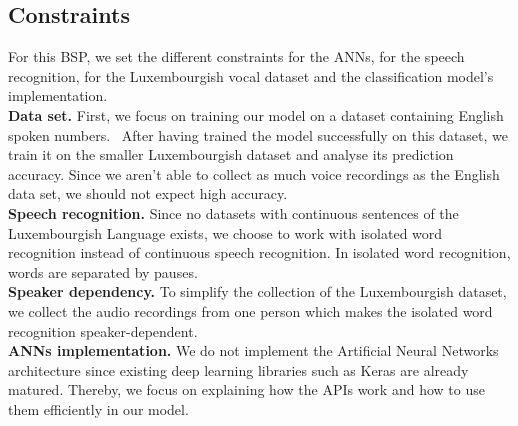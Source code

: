 
\subsection{Constraints}

For this BSP, we set the different constraints for the ANNs, for the speech
recognition, for the Luxembourgish vocal dataset and the classification model's
implementation.\\

\textbf{Data set.} First, we focus on training our model on a dataset
containing English spoken numbers.~\cite{DBLP:journals/corr/abs-1804-03209}
After having trained the model successfully on this dataset, we train it on the
smaller Luxembourgish dataset and analyse its prediction accuracy. Since we
aren't able to collect as much voice recordings as the English data set, we
should not expect high accuracy.\\


\textbf{Speech recognition.} Since no datasets with continuous sentences of the
Luxembourgish Language exists, we choose to work with isolated word recognition
instead of continuous speech recognition. In isolated word recognition, words are
separated by pauses.\\

\textbf{Speaker dependency.} To simplify the collection of the Luxembourgish
dataset, we collect the audio recordings from one person which makes the
isolated word recognition speaker-dependent.\\

\textbf{ANNs implementation.} We do not implement the Artificial Neural Networks
architecture since existing deep learning libraries such as Keras are already
matured. Thereby, we focus on explaining how the APIs work and how to use them
efficiently in our model.
